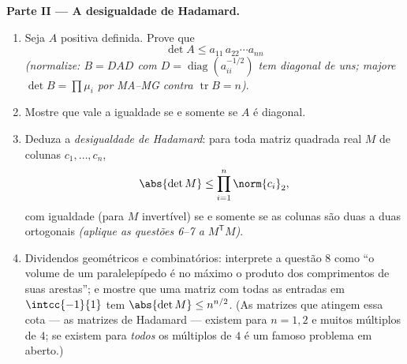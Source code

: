 \begin{problem}
\medskip
\noindent\textbf{Parte II --- A desigualdade de Hadamard.}
\begin{enumerate}[resume]
  \item Seja $A$ positiva definida. Prove que
        \[
        \det A \leq a_{11}\,a_{22}\cdots a_{nn}
        \]
        \emph{(normalize: $B = DAD$ com $D =
        \operatorname{diag}(a_{ii}^{-1/2})$ tem diagonal de uns;
        majore $\det B = \prod \mu_i$ por MA--MG contra
        $\operatorname{tr} B = n$)}.
  \item Mostre que vale a igualdade se e somente se $A$ é diagonal.
  \item Deduza a \emph{desigualdade de Hadamard}: para toda matriz
        quadrada real $M$ de colunas $c_1, \dots, c_n$,
        \[
        \abs{\det M} \leq \prod_{i=1}^{n}\norm{c_i}_2 ,
        \]
        com igualdade (para $M$ invertível) se e somente se as colunas são
        duas a duas ortogonais \emph{(aplique as questões 6--7 a
        $M^{\mathsf T}M$)}.
  \item Dividendos geométricos e combinatórios: interprete
        a questão 8 como ``o volume de um paralelepípedo é no
        máximo o produto dos comprimentos de suas arestas''; e mostre que uma
        matriz com todas as entradas em $\intcc{-1}{1}$ tem
        $\abs{\det M} \leq n^{n/2}$. (As matrizes que atingem essa
        cota --- as matrizes de Hadamard --- existem para $n = 1, 2$
        e muitos múltiplos de $4$; se existem para \emph{todos}
        os múltiplos de $4$ é um famoso problema em aberto.)
\end{enumerate}


\end{problem}

